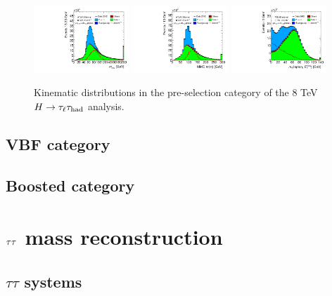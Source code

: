 \begin{figure}[tp]
  \includegraphics[width=0.32\textwidth]{figures/presel/mvis}
  \includegraphics[width=0.32\textwidth]{figures/presel/mMMC}
  \includegraphics[width=0.32\textwidth]{figures/presel/mT-hi} \\
  \caption{Kinematic distributions in the pre-selection category of the 8 TeV $H\rightarrow\tau_\ell\tau_\text{had}$ analysis.}
  \label{fig:stategy-presel-2}
\end{figure}

\subsection{VBF category}
\label{sec:strategy-VBF}

\subsection{Boosted category}
\label{sec:strategy-boost}

\clearpage

\section{$\tau\tau$ mass reconstruction}
\label{sec:strategy-mtautau}

\subsection{$\tau\tau$ systems}
\label{sec:strategy-mtautau-intro}

